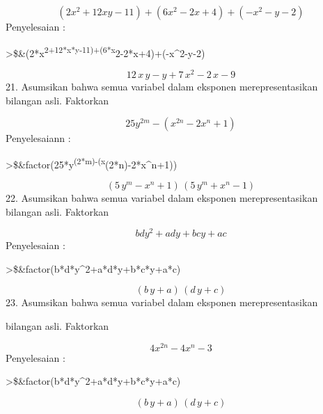 \documentclass[
]{book}
\begin{document}
\[(2x^2+12xy-11)+(6x^2-2x+4)+(-x^2-y-2)\]Penyelesaian :

\textgreater\$\&(2*x\textsuperscript{2+12*x*y-11)+(6*x}2-2*x+4)+(-x\^{}2-y-2)

\[12\,x\,y-y+7\,x^2-2\,x-9\]21. Asumsikan bahwa semua variabel dalam eksponen merepresentasikan bilangan asli. Faktorkan

\[25y^{2m}-(x^{2n}-2x^n+1)\]Penyelesaiann :

\textgreater\$\&factor(25*y\textsuperscript{(2*m)-(x}(2*n)-2*x\^{}n+1))

\[\left(5\,y^{m}-x^{n}+1\right)\,\left(5\,y^{m}+x^{n}-1\right)\]22. Asumsikan bahwa semua variabel dalam eksponen merepresentasikan bilangan asli. Faktorkan

\[bdy^2+ady+bcy+ac\]Penyelesaian :

\textgreater\$\&factor(b*d*y\^{}2+a*d*y+b*c*y+a*c)

\[\left(b\,y+a\right)\,\left(d\,y+c\right)\]23. Asumsikan bahwa semua variabel dalam eksponen merepresentasikan

bilangan asli. Faktorkan

\[4x^{2n}-4x^n-3\]Penyelesaian :

\textgreater\$\&factor(b*d*y\^{}2+a*d*y+b*c*y+a*c)

\[\left(b\,y+a\right)\,\left(d\,y+c\right)\]

\backmatter
\end{document}
